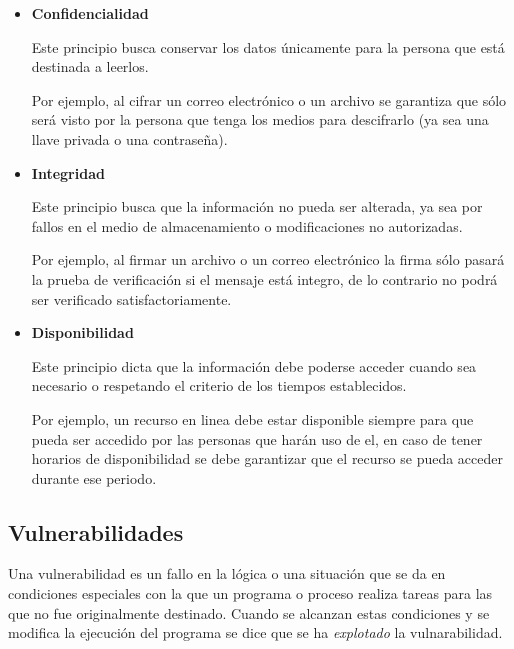 \begin{itemize}

  \item \textbf{Confidencialidad}

Este principio busca conservar los datos \'{u}nicamente para la persona que est\'{a} destinada a leerlos.

Por ejemplo, al cifrar un correo electr\'{o}nico o un archivo se garantiza que s\'{o}lo ser\'{a} visto por la persona que tenga los medios para descifrarlo (ya sea una llave privada o una contrase\~{n}a).

  \item \textbf{Integridad}

Este principio busca que la informaci\'{o}n no pueda ser alterada, ya sea por fallos en el medio de almacenamiento o modificaciones no autorizadas.

Por ejemplo, al firmar un archivo o un correo electr\'{o}nico la firma s\'{o}lo pasar\'{a} la prueba de verificaci\'{o}n si el mensaje est\'{a} integro, de lo contrario no podr\'{a} ser verificado satisfactoriamente.

  \item \textbf{Disponibilidad}

Este principio dicta que la informaci\'{o}n debe poderse acceder cuando sea necesario o respetando el criterio de los tiempos establecidos.

Por ejemplo, un recurso en linea debe estar disponible siempre para que pueda ser accedido por las personas que har\'{a}n uso de el, en caso de tener horarios de disponibilidad se debe garantizar que el recurso se pueda acceder durante ese periodo.

\end{itemize}

  \subsection {Vulnerabilidades}

Una vulnerabilidad es un fallo en la l\'{o}gica o una situaci\'{o}n que se da en condiciones especiales con la que un programa o proceso realiza tareas para las que no fue originalmente destinado. Cuando se alcanzan estas condiciones y se modifica la ejecuci\'{o}n del programa se dice que se ha \textit{explotado} la vulnarabilidad.


